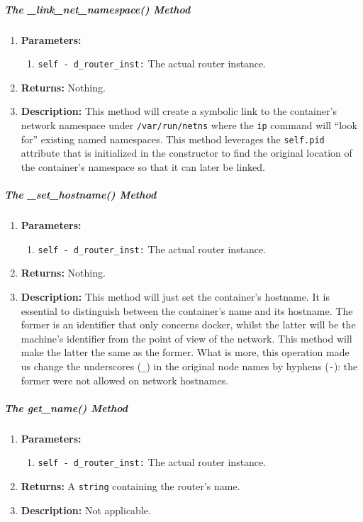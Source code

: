         \subparagraph{The \_link\_net\_namespace() Method}
            \begin{enumerate}
                \item \textbf{Parameters:}
                \begin{enumerate}
                    \item \texttt{self - d\_router\_inst:} The actual router instance.
                \end{enumerate}
                \item \textbf{Returns:} Nothing.
                \item \textbf{Description:} This method will create a symbolic link to the container's network namespace under \texttt{/var/run/netns} where the \texttt{ip} command will ``look for'' existing named namespaces. This method leverages the \texttt{self.pid} attribute that is initialized in the constructor to find the original location of the container's namespace so that it can later be linked.
            \end{enumerate}

        \subparagraph{The \_set\_hostname() Method}
            \begin{enumerate}
                \item \textbf{Parameters:}
                \begin{enumerate}
                    \item \texttt{self - d\_router\_inst:} The actual router instance.
                \end{enumerate}
                \item \textbf{Returns:} Nothing.
                \item \textbf{Description:} This method will just set the container's hostname. It is essential to distinguish between the container's name and its hostname. The former is an identifier that only concerns docker, whilst the latter will be the machine's identifier from the point of view of the network. This method will make the latter the same as the former. What is more, this operation made us change the underscores (\texttt{\_}) in the original node names by hyphens (\texttt{-}): the former were not allowed on network hostnames.
            \end{enumerate}

        \subparagraph{The get\_name() Method}
            \begin{enumerate}
                \item \textbf{Parameters:}
                \begin{enumerate}
                    \item \texttt{self - d\_router\_inst:} The actual router instance.
                \end{enumerate}
                \item \textbf{Returns:} A \texttt{string} containing the router's name.
                \item \textbf{Description:} Not applicable.
            \end{enumerate}

